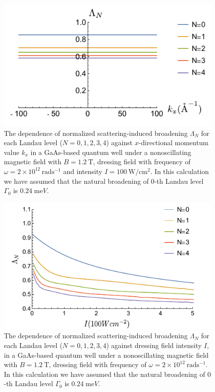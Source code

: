 \begin{figure}[t]
\includegraphics[scale=0.68]{figures/fig_3}
\caption{\label{fig_3} The dependence of normalized scattering-induced broadening $\Lambda_N$ for each Landau level ($N =0,1,2,3,4$) against $x$-directional momentum value $k_x$ in a GaAs-based quantum well under a nonoscillating magnetic field with $B = 1.2~\text{T}$, dressing field with frequency of $\omega =2\times10^{12}~\text{rad}\text{s}^{-1}$ and intensity $I =100~\text{W}/\text{cm}^{2}$.
In this calculation we have assumed that the natural  broadening of $0$-th Landau level $\Gamma_0$ is $0.24\;\text{me}V$.}
\end{figure}

\begin{figure}[b]
\includegraphics[scale=0.68]{figures/fig_4}
\caption{\label{fig_4} The dependence of normalized scattering-induced broadening $\Lambda_N$ for each Landau level ($N =0,1,2,3,4$) against dressing field intensity $I$, in a GaAs-based quantum well under a nonoscillating magnetic field with $B = 1.2~\text{T}$, dressing field with frequency of $\omega =2\times10^{12}~\text{rad}\text{s}^{-1}$. In this calculation we have assumed that the natural broadening of $0$-th Landau level $\Gamma_0$ is $0.24\;\text{me}V$.}
\end{figure}

